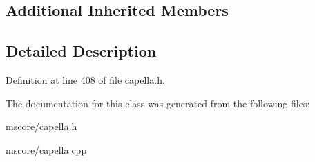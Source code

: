 \subsection*{Additional Inherited Members}


\subsection{Detailed Description}


Definition at line 408 of file capella.\+h.



The documentation for this class was generated from the following files\+:\begin{DoxyCompactItemize}
\item 
mscore/capella.\+h\item 
mscore/capella.\+cpp\end{DoxyCompactItemize}
